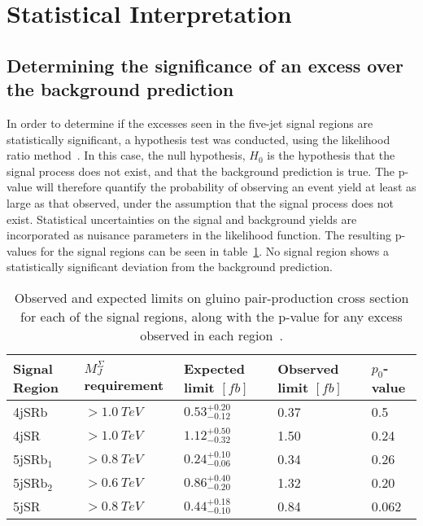 \section{Statistical Interpretation}\label{sec:results_stats}

\subsection{Determining the significance of an excess over the background prediction}\label{subsec:results_stats_excess}
In order to determine if the excesses seen in the five-jet signal regions are statistically significant,
a hypothesis test was conducted, using the likelihood ratio method~\cite{results-stats-asymptotic}.
In this case, the null hypothesis, $H_0$ is the hypothesis that the signal process does not exist, and that the background prediction is true.
The p-value will therefore quantify the probability of observing an event yield at least as large as that observed, under the assumption that the signal process does not exist.
Statistical uncertainties on the signal and background yields are incorporated as nuisance parameters in the likelihood function.
The resulting p-values for the signal regions can be seen in table~\ref{tbl:results_model_ind_limits}.
No signal region shows a statistically significant deviation from the background prediction.

\begin{table}[!ht]
    \centering

    \begin{tabular}{lllll}
        \toprule
        Signal Region & $M_{J}^{\Sigma}$ requirement & Expected limit $[fb]$  & Observed limit $[fb]$ & $p_0$-value \\
        \midrule
        4jSRb           & $>1.0~TeV$                      & $0.53^{+0.20}_{-0.12}$ & 0.37 & 0.5   \\
        4jSR            & $>1.0~TeV$                      & $1.12^{+0.50}_{-0.32}$ & 1.50 & 0.24  \\
        5jSRb$_1$       & $>0.8~TeV$                      & $0.24^{+0.10}_{-0.06}$ & 0.34 & 0.26  \\
        5jSRb$_2$       & $>0.6~TeV$                      & $0.86^{+0.40}_{-0.20}$ & 1.32 & 0.20  \\
        5jSR            & $>0.8~TeV$                      & $0.44^{+0.18}_{-0.10}$ & 0.84 & 0.062 \\
        \bottomrule
    \end{tabular}

    \caption{Observed and expected limits on gluino pair-production cross section for each of the signal regions,
    along with the p-value for any excess observed in each region~\cite{paper-plb}.}
\label{tbl:results_model_ind_limits}
\end{table}

